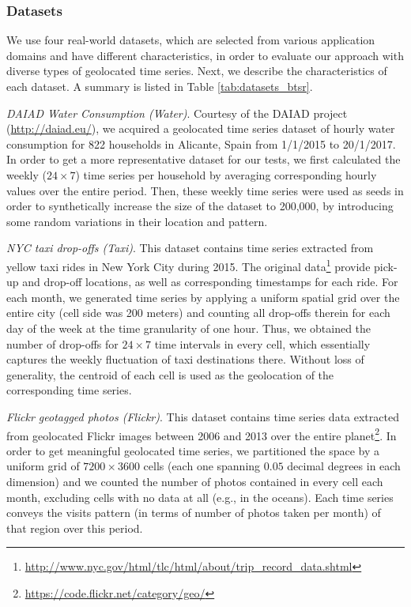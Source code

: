 \subsubsection{Datasets}

We use four real-world datasets, which are selected from various application domains and have different characteristics, in order to evaluate our approach with diverse types of geolocated time series. Next, we describe the characteristics of each dataset. A summary is listed in Table \ref{tab:datasets_btsr}.

\emph{DAIAD Water Consumption (Water)}. Courtesy of the DAIAD project (\url{http://daiad.eu/}), we acquired a geolocated time series dataset of hourly water consumption for 822 households in Alicante, Spain from 1/1/2015 to 20/1/2017. In order to get a more representative dataset for our tests, we first calculated the weekly  ($24 \times 7$) time series per household by averaging corresponding hourly values over the entire period. Then, these weekly time series were used as seeds in order to synthetically increase the size of the dataset to 200,000, by introducing some random variations in their location and pattern.

\emph{NYC taxi drop-offs (Taxi)}. This dataset contains time series extracted from yellow taxi rides in New York City during 2015. The original data\footnote{\url{http://www.nyc.gov/html/tlc/html/about/trip_record_data.shtml}} provide pick-up and drop-off locations, as well as corresponding timestamps for each ride. For each month, we generated time series by applying a uniform spatial grid over the entire city (cell side was 200 meters) and counting all drop-offs therein for each day of the week at the time granularity of one hour. Thus, we obtained the number of drop-offs for $24 \times 7$ time intervals in every cell, which essentially captures the weekly fluctuation of taxi destinations there. Without loss of generality, the centroid of each cell is used as the geolocation of the corresponding time series.

\emph{Flickr geotagged photos (Flickr)}. This dataset contains time series data extracted from geolocated Flickr images between 2006 and 2013 over the entire planet\footnote{\url{https://code.flickr.net/category/geo/}}. In order to get meaningful geolocated time series, we partitioned the space by a uniform grid of $7200 \times 3600$ cells (each one spanning $0.05$ decimal degrees in each dimension) and we counted the number of photos contained in every cell each month, excluding cells with no data at all (e.g., in the oceans). Each time series conveys the visits pattern (in terms of number of photos taken per month) of that region over this period.

